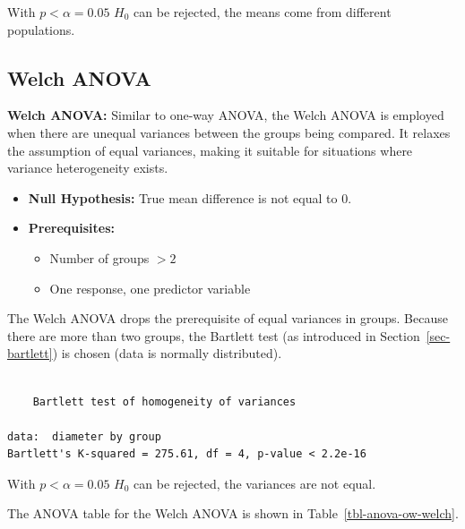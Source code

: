 \documentclass[
  a4paper,
]{scrbook}
\providecommand{\tightlist}{%
  \setlength{\itemsep}{0pt}\setlength{\parskip}{0pt}}\usepackage{longtable,booktabs,array}
\begin{document}
With \(p<\alpha = 0.05\) \(H_0\) can be rejected, the means come from
different populations.

\subsection{Welch ANOVA}\label{welch-anova}

\textbf{Welch ANOVA:} Similar to one-way ANOVA, the Welch ANOVA is
employed when there are unequal variances between the groups being
compared. It relaxes the assumption of equal variances, making it
suitable for situations where variance heterogeneity exists.

\begin{itemize}
\tightlist
\item
  \textbf{Null Hypothesis:} True mean difference is not equal to 0.
\item
  \textbf{Prerequisites:}

  \begin{itemize}
  \tightlist
  \item
    Number of groups \(>2\)
  \item
    One response, one predictor variable
  \end{itemize}
\end{itemize}

The Welch ANOVA drops the prerequisite of equal variances in groups.
Because there are more than two groups, the Bartlett test (as introduced
in Section~\ref{sec-bartlett}) is chosen (data is normally distributed).

\begin{verbatim}

    Bartlett test of homogeneity of variances

data:  diameter by group
Bartlett's K-squared = 275.61, df = 4, p-value < 2.2e-16
\end{verbatim}

With \(p<\alpha = 0.05\) \(H_0\) can be rejected, the variances are not
equal.

The ANOVA table for the Welch ANOVA is shown in
Table~\ref{tbl-anova-ow-welch}.
\end{document}
